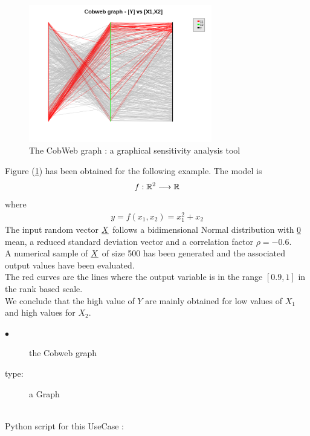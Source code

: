 \begin{figure}[H]
  \begin{center}
    \includegraphics[width=8cm]{Figures/cobWeb.png}
    \caption{The CobWeb graph : a graphical sensitivity analysis tool}
    \label{CobWeb}
  \end{center}
\end{figure}


Figure (\ref{CobWeb}) has been obtained for the following example. The model is
\begin{align*}
  f : {\mathbb R}^2 \longrightarrow  {\mathbb R}
\end{align*}
where
\begin{align*}
  y = f(x_1, x_2)  = x_1^2 + x_2
\end{align*}
The input random vector ${\underline{X}}$ follows a bidimensional Normal distribution with ${\underline{0}}$ mean, a reduced standard deviation vector and a correlation factor $\rho = -0.6$.\\
A numerical sample of ${\underline{X}}$ of size 500 has been generated and the associated output values have been evaluated.\\
The red curves are the lines where the output variable is in the range $[0.9, 1]$ in the rank based scale.\\
We conclude that the high value of $Y$ are mainly obtained for low values of $X_1$ and high values for $X_2$.\\


             {
               \begin{description}
               \item[$\bullet$] the Cobweb graph
               \item[type:] a Graph
               \end{description}
             }

             \textspace\\

             Python  script for this UseCase :

